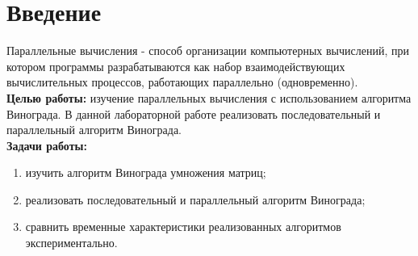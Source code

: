 \chapter*{Введение}


Параллельные вычисления - способ организации компьютерных вычислений,
при котором программы разрабатываются как набор взаимодействующих вычислительных процессов, работающих параллельно (одновременно).
\\


\textbf{Целью работы:} изучение параллельных вычисления
с использованием алгоритма Винограда.
В данной лабораторной работе реализовать
последовательный и параллельный алгоритм Винограда.
\\

\textbf{Задачи работы:}

\begin{enumerate}
    \setlength{\itemsep}{0em}
    \item изучить алгоритм Винограда умножения матриц;
    \item реализовать последовательный и параллельный алгоритм Винограда;
    \item сравнить временные характеристики реализованных алгоритмов экспериментально.
\end{enumerate}
